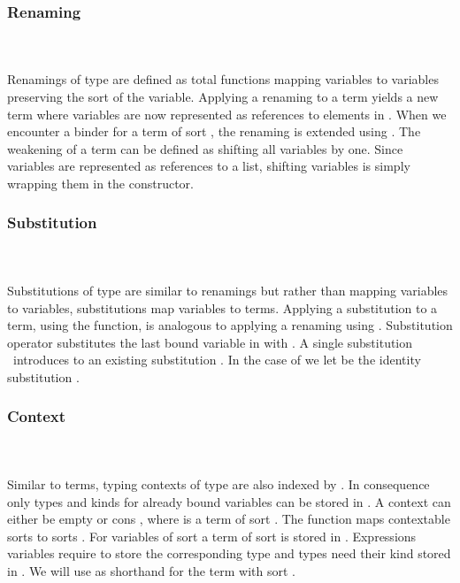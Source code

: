 \subsubsection{Renaming}\hfill\\\\
Renamings  of type    are defined as total functions mapping variables    to variables    preserving the sort  of the variable.
\FRen
Applying a renaming    to a term    yields a new term    where variables are now represented as references to elements in .
\Fren
When we encounter a binder for a term of sort , the renaming is extended using \Frenext. 
The weakening of a term can be defined as shifting all variables by one.
\Fwk 
Since variables are represented as references to a list, shifting variables is simply wrapping them in the  constructor.

\subsubsection{Substitution}\hfill\\\\
Substitutions  of type    are similar to renamings but rather than mapping variables to variables, substitutions map variables to terms.
\FSub
Applying a substitution to a term, using the  function, is analogous to applying a renaming using . 
Substitution operator  \Data{[}  \Data{]} substitutes the last bound variable in  with .
\Fsubs
A single substitution \Fsinglesub\ introduces  to an existing substitution . In the case of \Data{\_[\_]} we let  be the identity substitution \Fidsub.

\subsubsection{Context}\hfill\\\\
Similar to terms, typing contexts  of type   are also indexed by . In consequence only types and kinds for already bound variables can be stored in .
\FCtx
A context can either be empty  or cons   , where  is a term of sort  . The function  maps contextable sorts  to sorts . For variables of sort  a term of sort  is stored in .
\Fkind
Expressions variables require  to store the corresponding type and types need their kind stored in . We will use  as shorthand for the term with sort  . 
